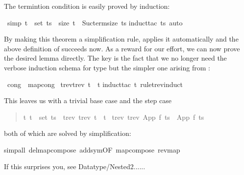 %
\begin{isabellebody}%
%
\begin{isamarkuptext}%
\noindent
The termintion condition is easily proved by induction:%
\end{isamarkuptext}%
\ {\isacharbrackleft}simp{\isacharbrackright}{\isacharcolon}\ {\isachardoublequote}t\ {\isasymin}\ set\ ts\ {\isasymlongrightarrow}\ size\ t\ {\isacharless}\ Suc{\isacharparenleft}term{\isacharunderscore}size\ ts{\isacharparenright}{\isachardoublequote}\isanewline
{}induct{\isacharunderscore}tac\ ts{\isacharcomma}\ auto{\isacharparenright}%
\begin{isamarkuptext}%
\noindent
By making this theorem a simplification rule, 
applies it automatically and the above definition of 
succeeds now. As a reward for our effort, we can now prove the desired
lemma directly. The key is the fact that we no longer need the verbose
induction schema for type  but the simpler one arising from
:%
\end{isamarkuptext}%
\ {\isacharbrackleft}cong{\isacharbrackright}\ {\isacharequal}\ map{\isacharunderscore}cong\isanewline
{}\ {\isachardoublequote}trev{\isacharparenleft}trev\ t{\isacharparenright}\ {\isacharequal}\ t{\isachardoublequote}\isanewline
{}induct{\isacharunderscore}tac\ t\ rule{\isacharcolon}trev{\isachardot}induct{\isacharparenright}%
\begin{isamarkuptxt}%
\noindent
This leaves us with a trivial base case  and the step case
\begin{quote}

\begin{isabelle}%
{\isasymforall}\mbox{t}{\isachardot}\ \mbox{t}\ {\isasymin}\ set\ \mbox{ts}\ {\isasymlongrightarrow}\ trev\ {\isacharparenleft}trev\ \mbox{t}{\isacharparenright}\ {\isacharequal}\ \mbox{t}\ {\isasymLongrightarrow}\isanewline
trev\ {\isacharparenleft}trev\ {\isacharparenleft}App\ \mbox{f}\ \mbox{ts}{\isacharparenright}{\isacharparenright}\ {\isacharequal}\ App\ \mbox{f}\ \mbox{ts}
\end{isabelle}%

\end{quote}
both of which are solved by simplification:%
\end{isamarkuptxt}%
simp{\isacharunderscore}all\ del{\isacharcolon}map{\isacharunderscore}compose\ add{\isacharcolon}sym{\isacharbrackleft}OF\ map{\isacharunderscore}compose{\isacharbrackright}\ rev{\isacharunderscore}map{\isacharparenright}%
\begin{isamarkuptext}%
\noindent
If this surprises you, see Datatype/Nested2......


\end{isamarkuptext}
\end{isabellebody}
